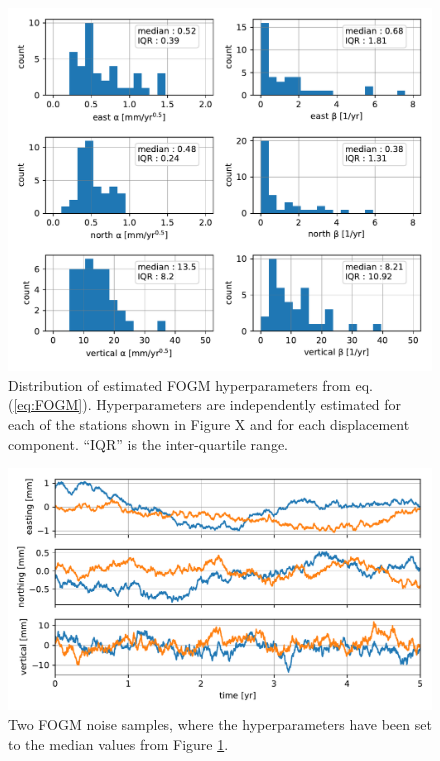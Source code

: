 \documentclass[10pt,a4paper]{article}
\begin{document}
\begin{figure}
\includegraphics{figures/noise/noise-params.pdf}
\caption{Distribution of estimated FOGM hyperparameters from eq. (\ref{eq:FOGM}).  Hyperparameters are independently estimated for each of the stations shown in Figure X and for each displacement component. ``IQR'' is the inter-quartile range.}   
\label{fig:NoiseParams}
\end{figure}

\begin{figure}
\includegraphics{figures/noise/noise-samples.pdf}
\caption{Two FOGM noise samples, where the hyperparameters have been set to the median values from Figure \ref{fig:NoiseParams}.}   
\label{fig:NoiseSamples}
\end{figure}
\end{document}
